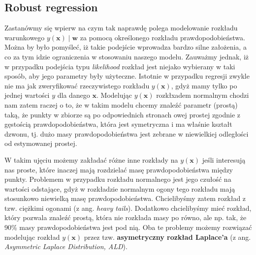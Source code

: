 \documentclass{myclass}
\numberwithin{equation}{section}
\begin{document}
\subsection{Robust regression}

Zastanówmy się wpierw na czym tak naprawdę polega modelowanie rozkładu warunkowego \(y(\mathbf{x})
\mid \mathbf{w}\) za pomocą określonego rozkładu prawdopodobieństwa. Można by było pomyśleć, iż
takie podejście wprowadza bardzo silne założenia, a co za tym idzie ograniczenia w stosowaniu
naszego modelu. Zauważmy jednak, iż w przypadku podejścia typu \textit{likelihood} rozkład jest
niejako wybierany w taki sposób, aby jego parametry były użyteczne. Istotnie w przypadku regresji
zwykle nie ma jak zweryfikować rzeczywistego rozkładu \(y(\mathbf{x})\), gdyż mamy tylko po jednej
wartości \(y\) dla danego \(\mathbf{x}\). Modelując \(y(\mathbf{x})\) rozkłxadem normalnym chodzi nam
zatem raczej o to, że w takim modelu chcemy znaleźć parametr (prostą) taką, że punkty w zbiorze są
po odpowiednich stronach owej prostej zgodnie z gęstością prawdopodobieństwa, która jest symetryczna
i ma właśnie kształt dzwonu, tj. dużo masy prawdopodobieństwa jest zebrane w niewielkiej odległości
od estymowanej prostej.

W takim ujęciu możemy zakładać różne inne rozkłady na \(y(\mathbf{x})\) jeśli interesują nas proste,
które inaczej mają rozdzielać masę prawdopodobieństwa między punkty. Problemem w przypadku rozkładu
normalnego jest jego czułość na wartości odstające, gdyż w rozkładzie normalnym ogony tego rozkładu
mają stosunkowo niewielką masę prawdopodobieństwa. Chcielibyśmy zatem rozkład z tzw. ciężkimi
ogonami (z ang. \textit{heavy tails}). Dodatkowo chcielibyśmy mieć rozkład, który pozwala znaleźć
prostą, która nie rozkłada masy po równo, ale np. tak, że 90\% masy prawdopodobieństwa jest pod nią.
Oba te problemy możemy rozwiązać modelując rozkład \(y(\mathbf{x})\) przez tzw. \textbf{asymetryczny
rozkład Laplace'a} (z ang. \textit{Asymmetric Laplace Distribution, ALD}).
\end{document}
